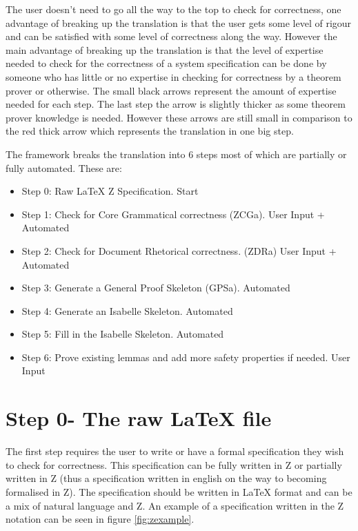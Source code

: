 The user doesn't need to go all the way to the top to check for correctness, one advantage of breaking up the translation is that the user gets some level of rigour and can be satisfied with some level of correctness along the way. However the main advantage of breaking up the translation is that the level of expertise needed to check for the correctness of a system specification can be done by someone who has little or no expertise in checking for correctness by a theorem prover or otherwise. The small black arrows represent the amount of expertise needed for each step. The last step the arrow is slightly thicker as some theorem prover knowledge is needed. However these arrows are still small in comparison to the red thick arrow which represents the translation in one big step.

The framework breaks the translation into 6 steps most of which are partially or fully automated. These are:

\begin{itemize}
\item Step 0: Raw LaTeX Z Specification. {\color{set}Start}
\item Step 1: Check for Core Grammatical correctness (ZCGa). {\color{set}User Input + Automated}
\item Step 2: Check for Document Rhetorical correctness. {\color{set}(ZDRa) User Input + Automated}
\item Step 3: Generate a General Proof Skeleton (GPSa). {\color{set}Automated}
\item Step 4: Generate an Isabelle Skeleton. {\color{set}Automated}
\item Step 5: Fill in the Isabelle Skeleton. {\color{set}Automated}
\item Step 6: Prove existing lemmas and add more safety properties if needed. {\color{set}User Input}
\end{itemize}

\section{Step 0- The raw LaTeX file}

The first step requires the user to write or have a formal specification they wish to check for correctness. This specification can be fully written in Z or partially written in Z (thus a specification written in english on the way to becoming formalised in Z). The specification should be written in \LaTeX{} format and can be a mix of natural language and Z. An example of a specification written in the Z notation can be seen in figure \ref{fig:zexample}.

